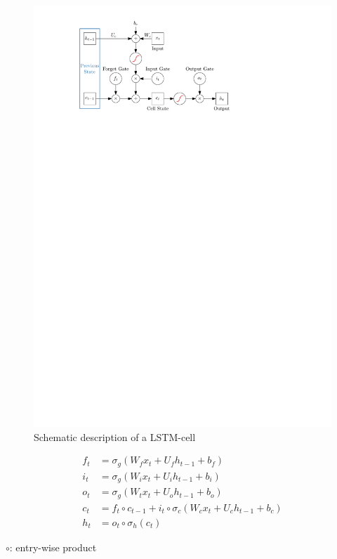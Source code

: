 \begin{figure}[t]
  \centering
  \includegraphics{./figures/theory/LSTM.pdf}
  \caption{Schematic description of a LSTM-cell}
  \label{fig:schematic_lstm}
\end{figure}

\begin{align}
  f_t &= \sigma_g( W_f x_t + U_f h_{t-1} + b_f) \\
  i_t &= \sigma_g( W_i x_t + U_i h_{t-1} + b_i) \\
  o_t &= \sigma_g( W_t x_t + U_o h_{t-1} + b_o) \\
  c_t &= f_t \circ c_{t-1} + i_t \circ \sigma_c(W_c x_t + U_c h_{t-1} + b_c) \\
  h_t &= o_t \circ \sigma_h(c_t)
\end{align}

$\circ$: entry-wise product


